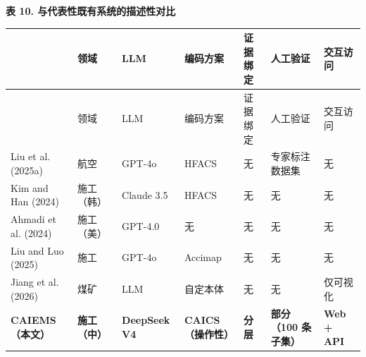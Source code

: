 \documentclass[11pt]{article}
\begin{document}
\textbf{{\cjkfont 表} 10. {\cjkfont 与\allowbreak 代\allowbreak 表\allowbreak 性\allowbreak 既\allowbreak 有\allowbreak 系\allowbreak 统\allowbreak 的\allowbreak 描\allowbreak 述\allowbreak 性\allowbreak 对\allowbreak 比}}

\begingroup\setlength{\tabcolsep}{2pt}\small
\begin{longtable}{>{\raggedright\arraybackslash}p{}>{\raggedright\arraybackslash}p{}>{\raggedright\arraybackslash}p{}>{\raggedright\arraybackslash}p{}>{\raggedright\arraybackslash}p{}>{\raggedright\arraybackslash}p{}>{\raggedright\arraybackslash}p{}}
\hline
{\cjkfont 系\allowbreak 统} & {\cjkfont 领\allowbreak 域} & LLM & {\cjkfont 编\allowbreak 码\allowbreak 方\allowbreak 案} & {\cjkfont 证\allowbreak 据\allowbreak 绑\allowbreak 定} & {\cjkfont 人\allowbreak 工\allowbreak 验\allowbreak 证} & {\cjkfont 交\allowbreak 互\allowbreak 访\allowbreak 问} \\
\hline\endfirsthead
\hline
{\cjkfont 系\allowbreak 统} & {\cjkfont 领\allowbreak 域} & LLM & {\cjkfont 编\allowbreak 码\allowbreak 方\allowbreak 案} & {\cjkfont 证\allowbreak 据\allowbreak 绑\allowbreak 定} & {\cjkfont 人\allowbreak 工\allowbreak 验\allowbreak 证} & {\cjkfont 交\allowbreak 互\allowbreak 访\allowbreak 问} \\
\hline\endhead
Liu et al. (2025a) & {\cjkfont 航\allowbreak 空} & GPT-4o & HFACS & {\cjkfont 无} & {\cjkfont 专\allowbreak 家\allowbreak 标\allowbreak 注\allowbreak 数\allowbreak 据\allowbreak 集} & {\cjkfont 无} \\
Kim and Han (2024) & {\cjkfont 施\allowbreak 工\allowbreak （\allowbreak 韩\allowbreak ）} & Claude 3.5 & HFACS & {\cjkfont 无} & {\cjkfont 无} & {\cjkfont 无} \\
Ahmadi et al. (2024) & {\cjkfont 施\allowbreak 工\allowbreak （\allowbreak 美\allowbreak ）} & GPT-4.0 & {\cjkfont 无} & {\cjkfont 无} & {\cjkfont 无} & {\cjkfont 无} \\
Liu and Luo (2025) & {\cjkfont 施\allowbreak 工} & GPT-4o & Accimap & {\cjkfont 无} & {\cjkfont 无} & {\cjkfont 无} \\
Jiang et al. (2026) & {\cjkfont 煤\allowbreak 矿} & LLM & {\cjkfont 自\allowbreak 定\allowbreak 本\allowbreak 体} & {\cjkfont 无} & {\cjkfont 无} & {\cjkfont 仅\allowbreak 可\allowbreak 视\allowbreak 化} \\
\textbf{CAIEMS{\cjkfont （\allowbreak 本\allowbreak 文\allowbreak ）}} & \textbf{{\cjkfont 施\allowbreak 工\allowbreak （\allowbreak 中\allowbreak ）}} & \textbf{DeepSeek V4} & \textbf{CAICS{\cjkfont （\allowbreak 操\allowbreak 作\allowbreak 性\allowbreak ）}} & \textbf{{\cjkfont 分\allowbreak 层}} & \textbf{{\cjkfont 部\allowbreak 分\allowbreak （}100 {\cjkfont 条\allowbreak 子\allowbreak 集\allowbreak ）}} & \textbf{Web + API} \\
\hline
\end{longtable}\endgroup
\end{document}
